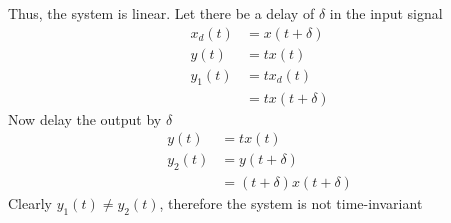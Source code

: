  Thus, the system is linear.
      Let there be a delay of $\delta$ in the input signal 
      \begin{align}
       x_{d}(t)&=x(t+\delta )  \\
       y(t)&=tx(t)\\
       y_{1}(t)&=tx_{d}(t)\\
       &=tx(t+\delta )
      \end{align}
     Now delay the output by $\delta$
 \begin{align}
  y(t)&=tx(t)\\
  y_{2}(t)&=y(t+\delta )\\
  &=(t+\delta )x(t+\delta )
 \end{align}
 Clearly $ y_{1}(t)\neq y_{2}(t)$, therefore the system is not time-invariant
 